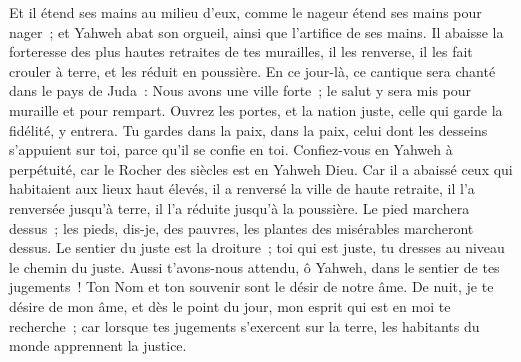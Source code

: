 \begin{multicols}{2}
Et il étend ses mains au milieu d'eux, comme le nageur étend ses mains pour nager~; et Yahweh abat son orgueil, ainsi que l'artifice de ses mains.
Il abaisse la forteresse des plus hautes retraites de tes murailles, il les renverse, il les fait crouler à terre, et les réduit en poussière.
\VerseOne{}En ce jour-là, ce cantique sera chanté dans le pays de Juda~: Nous avons une ville forte~; le salut y sera mis pour muraille et pour rempart.
Ouvrez les portes, et la nation juste, celle qui garde la fidélité, y entrera.
Tu gardes dans la paix, dans la paix, celui dont les desseins s'appuient sur toi, parce qu'il se confie en toi.
Confiez-vous en Yahweh à perpétuité, car le Rocher  des siècles est en Yahweh Dieu.
Car il a abaissé ceux qui habitaient aux lieux haut élevés, il a renversé la ville de haute retraite, il l'a renversée jusqu'à terre, il l'a réduite jusqu'à la poussière.
Le pied marchera dessus~; les pieds, dis-je, des pauvres, les plantes des misérables marcheront dessus.
Le sentier du juste est la droiture~; toi qui est juste, tu dresses au niveau le chemin du juste.
Aussi t'avons-nous attendu, ô Yahweh, dans le sentier de tes jugements~! Ton Nom et ton souvenir sont le désir de notre âme.
De nuit, je te désire de mon âme, et dès le point du jour, mon esprit qui est en moi te recherche~; car lorsque tes jugements s'exercent sur la terre, les habitants du monde apprennent la justice.

\end{multicols}
